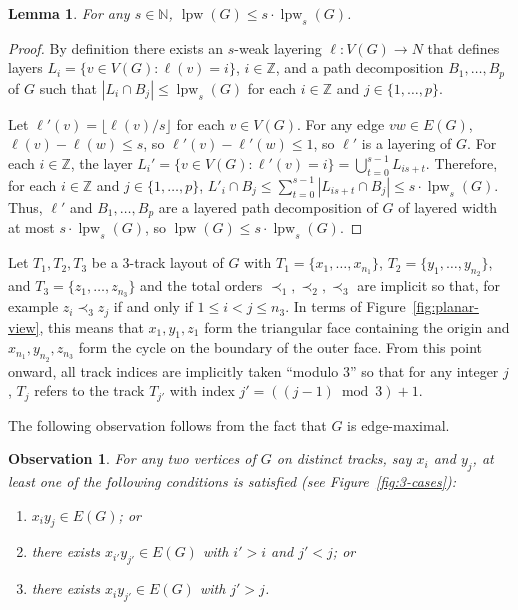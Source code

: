 \documentclass{jgaa-art}
\newcommand{\Z}{\mathbb{Z}}
\newcommand{\N}{\mathbb{N}}
\newcommand{\figref}[1]{\mbox{Figure~\ref{fig:#1}}}
\newtheorem{lem}{Lemma}{\bfseries}{\itshape}
\newcommand{\lemlabel}[1]{\label{lem:#1}}
\newtheorem{obs}{Observation}{\bfseries}{\itshape}
\newcommand{\obslabel}[1]{\label{obs:#1}}
\DeclareMathOperator{\lpw}{lpw}
\begin{document}
\begin{lem}\lemlabel{weak}
  For any $s\in\N$, $\lpw(G) \le s\cdot\lpw_s(G)$.
\end{lem}

\begin{proof}
    By definition there exists an $s$-weak layering $\ell:V(G)\to N$ that defines layers $L_i=\{v\in V(G):\ell(v)=i\}$, $i\in\Z$, and a path decomposition $B_1,\ldots,B_p$ of $G$ such that $|L_i\cap B_j|\le \lpw_s(G)$ for each $i\in\Z$ and $j\in\{1,\ldots,p\}$.

    Let $\ell'(v)=\lfloor \ell(v)/s\rfloor$ for each $v\in V(G)$.  For any edge $vw\in E(G)$, $\ell(v)-\ell(w)\le s$, so $\ell'(v)-\ell'(w)\le 1$, so $\ell'$ is a layering of $G$.  For each $i\in\Z$, the layer $L_i'=\{v\in V(G):\ell'(v)=i\}=\bigcup_{t=0}^{s-1} L_{is+t}$.  Therefore, for each $i\in \Z$ and $j\in\{1,\ldots,p\}$, $L'_i\cap B_j\le\sum_{t=0}^{s-1} |L_{is+t}\cap B_j| \le s\cdot\lpw_s(G)$.  Thus, $\ell'$ and $B_1,\ldots,B_p$ are a layered path decomposition of $G$ of layered width at most $s\cdot\lpw_s(G)$, so $\lpw(G)\le s\cdot\lpw_s(G)$.
\end{proof}

Let $T_1,T_2,T_3$ be a 3-track layout of $G$ with
$T_1=\{x_1,\ldots,x_{n_1}\}$, $T_2=\{y_1,\ldots,y_{n_2}\}$, and
$T_3=\{z_1,\ldots,z_{n_3}\}$ and the total orders $\prec_1,\prec_2,\prec_3$
are implicit so that, for example $z_i\prec_3 z_j$ if and only if $1\le i<j\le n_3$.
In terms of \figref{planar-view}, this means that $x_1,y_1,z_1$ form
the triangular face containing the origin and $x_{n_1},y_{n_2},z_{n_3}$
form the cycle on the boundary of the outer face.
From this point onward, all track indices are implicitly taken ``modulo 3''
so that for any integer $j$, $T_j$ refers to the track $T_{j'}$ with
index $j'=((j-1)\bmod 3)+1$.

The following observation follows from the fact that $G$ is edge-maximal.
\begin{obs}\obslabel{silly}
  For any two vertices of $G$ on distinct tracks, say $x_i$ and $y_j$, at least
  one of the following conditions is satisfied (see \figref{3-cases}):
  \begin{enumerate}
    \item $x_{i}y_{j}\in E(G)$; or
    \item there exists $x_{i'}y_{j'} \in E(G)$ with $i'>i$ and $j'<j$; or
    \item there exists $x_{i}y_{j'}\in E(G)$ with $j'>j$.
  \end{enumerate}
\end{obs}
\end{document}
